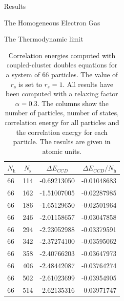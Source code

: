\documentclass[twoside,english]{uiofysmaster}
\begin{document}
\begin{chapter}{Results}
\begin{section}{The Homogeneous Electron Gas}
\begin{subsection}{The Thermodynamic limit}
			\begin{table}[H]
				\begin{center}
					\begin{tabular}[center]{l  c  c r}
						$N_{\text{h}}$ & $N_{\text{s}}$ & $\Delta E_{CCD}$ & $\Delta E_{CCD}/N_{\text{h}}$ \\
						\hline
						66 & 114 & -0.69213050 & -0.01048683 \\
						66 & 162 & -1.51007005 & -0.02287985 \\
						66 & 186 & -1.65129650 & -0.02501964 \\
						66 & 246 & -2.01158657 & -0.03047858 \\
						66 & 294 & -2.23052988 & -0.03379591 \\
						66 & 342 & -2.37274100 & -0.03595062 \\
						66 & 358 & -2.40766203 & -0.03647973 \\
						66 & 406 & -2.48442087 & -0.03764274 \\
						66 & 502 & -2.61023699 & -0.03954905 \\
						66 & 514 & -2.62135316 & -0.03971747 \\
					\end{tabular}
				\end{center}
				\caption{Correlation energies computed with coupled-cluster doubles equations for a system of $66$ particles. The value of $r_s$ is set to $r_s=1$. All results have been computed with a relaxing factor $\alpha=0.3$. The columns show the number of particles, number of states, correlation energy for all particles and the correlation energy for each particle. The results are given in atomic units.}
				\label{table:ThermodynamicLimit4}
			\end{table}


\end{subsection}
\end{section}
\end{chapter}
\end{document}
